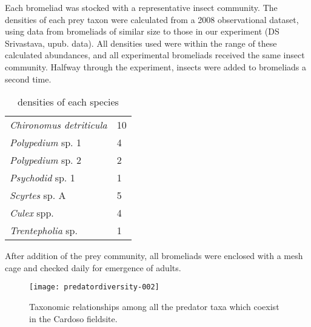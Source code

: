 \documentclass[10pt]{article}
\begin{document}
Each bromeliad was stocked with a representative insect community.
The densities of each prey taxon were calculated from a 2008
observational dataset, using data from bromeliads of similar size to
those in our experiment (DS Srivastava, upub. data).  All densities
used were within the range of these calculated abundances, and all
experimental bromeliads received the same insect community.  Halfway
through the experiment, insects were added to bromeliads a second
time.

\begin{table}
  \centering
  \caption{densities of each species}
  \label{tab:sppden}
  \begin{tabular}{l l}
    \hline
    \emph{Chironomus detriticula} & 10 \\
    \emph{Polypedium} sp. 1 & 4 \\
    \emph{Polypedium} sp. 2 & 2 \\
    \emph{Psychodid} sp. 1 & 1 \\
    \emph{Scyrtes} sp. A & 5 \\
    \emph{Culex} spp. & 4 \\
    \emph{Trentepholia} sp. & 1
  \end{tabular}
\end{table}



After addition of the prey community, all bromeliads were enclosed
with a mesh cage and checked daily for emergence of adults.







\begin{figure}
\begin{center}
\texttt{[image: predatordiversity-002]}
\end{center}
\caption{Taxonomic relationships among all the predator taxa which coexist in the Cardoso fieldsite.}
\label{fig:one}
\end{figure}



\end{document}
